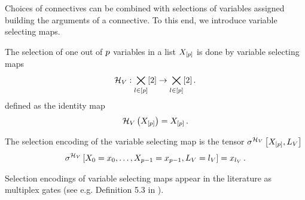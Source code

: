 %
%        



Choices of connectives can be combined with selections of variables assigned building the arguments of a connective.
To this end, we introduce variable selecting maps.

\begin{definition}
    \label{def:variableSelector}
    The selection of one out of $p$ variables in a list $X_{[p]}$ is done by variable selecting maps
    \begin{align}
        \mathcal{H}_{V} : \bigtimes_{l\in[p]}[2] \rightarrow \bigtimes_{l\in[p]}[2] \, .
    \end{align}
    defined as the identity map
    \begin{align*}
        \mathcal{H}_{V}\left(X_{[p]}\right) = X_{[p]} \, .
    \end{align*}
\end{definition}

The selection encoding of the variable selecting map is the tensor $\sigma^{\mathcal{H}_{V}}\left[X_{[p]},L_{V}\right]$
\begin{align*}
    \sigma^{\mathcal{H}_{V}}\left[X_{0}=x_{0},\ldots,X_{p-1}=x_{p-1},L_{V}=l_{V}\right] = x_{l_{V}} \, .
\end{align*}


Selection encodings of variable selecting maps appear in the literature as multiplex gates (see e.g. Definition 5.3 in \cite{koller_probabilistic_2009}).

